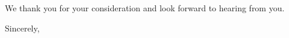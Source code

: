 \documentclass[11pt]{harvardletter}
\begin{document}
\begin{letter}{}











\vspace{5mm}

We thank you for your consideration and look forward to hearing from you.


\vspace{5mm}

\closing{Sincerely,}



\end{letter}
\end{document}
